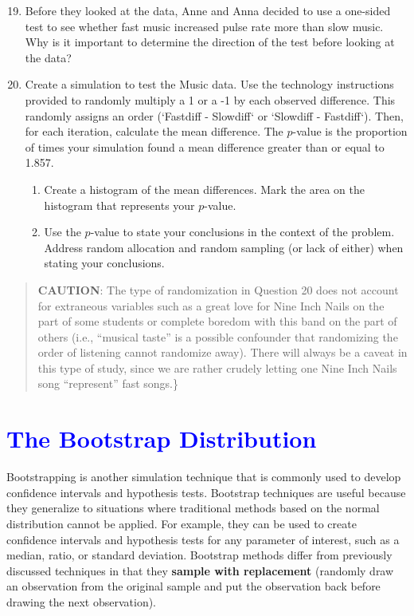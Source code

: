 \documentclass[
]{report}
\begin{document}
\begin{enumerate}
 \setcounter{enumi}{18}
 \item Before they looked at the data, Anne and Anna decided to use a one-sided test to see whether fast music increased pulse rate more than slow music. Why is it important to determine the direction of the test before looking at the data?

  \item  Create a simulation to test the Music data. Use the technology instructions provided to randomly multiply a 1 or a -1 by each observed difference. This randomly assigns an order (`Fastdiff -  Slowdiff` or `Slowdiff - Fastdiff`). Then, for each iteration, calculate the mean difference. The $\scriptstyle p$-value is the proportion of times your simulation found a mean difference greater than or equal to 1.857.

\begin{enumerate}
 \item Create a histogram of the mean differences. Mark the area on the histogram that represents your $\scriptstyle p$-value.
  
 \item Use the $\scriptstyle p$-value to state your conclusions in the context of the problem. Address random allocation and random sampling (or lack of either) when stating your conclusions.
 
\end{enumerate}
\end{enumerate}

\begin{quote}
\textbf{CAUTION}: The type of randomization in Question 20 does not account for extraneous variables such as a great love for Nine Inch Nails on the part of some students or complete boredom with this band on the part of others (i.e., ``musical taste'' is a possible confounder that randomizing the order of listening cannot randomize away). There will always be a caveat in this type of study, since we are rather crudely letting one Nine Inch Nails song ``represent'' fast songs.\}
\end{quote}

\hypertarget{section-7}{%
\section{\texorpdfstring{\textcolor{blue}{The Bootstrap Distribution}}{}}\label{section-7}}

Bootstrapping is another simulation technique that is commonly used to develop confidence intervals and hypothesis tests. Bootstrap techniques are useful because they generalize to situations where traditional methods based on the normal distribution cannot be applied. For example, they can be used to create confidence intervals and hypothesis tests for any parameter of interest, such as a median, ratio, or standard deviation. Bootstrap methods differ from previously discussed techniques in that they \textbf{sample with replacement} (randomly draw
an observation from the original sample and put the observation back before drawing the next observation).
\end{document}
